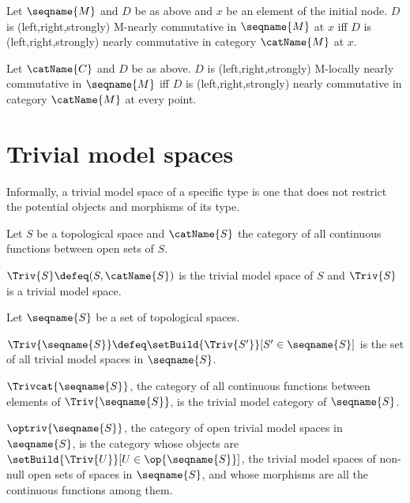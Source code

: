 \documentclass{article}
\begin{document}
\begin{definition}
\label{def:M-NCDp}
Let $\seqname{M}$ and $D$ be as above and $x$ be an element of the
initial node. $D$ is (left,right,strongly) M-nearly commutative in
$\seqname{M}$ at $x$ iff $D$ is (left,right,strongly) nearly commutative
in category $\catName{M}$ at $x$.
\end{definition}

\begin{definition}
\label{def:M-NCDl}
Let $\catName{C}$ and $D$ be as above. $D$ is (left,right,strongly)
M-locally nearly commutative in $\seqname{M}$ iff $D$ is
(left,right,strongly) nearly commutative in category $\catName{M}$ at
every point.
\end{definition}

\section{Trivial model spaces}
\label{sec:triv}
Informally, a trivial model space of a specific type is one that does
not restrict the potential objects and morphisms of its type.

\begin{definition}
\label{def:trivmod}
Let $S$ be a topological space and $\catName{S}$ the category of all
continuous functions between open sets of $S$.

$\Triv{S} \defeq (S, \catName{S})$ is the trivial model space
of $S$ and $\Triv{S}$ is a trivial model space.

Let $\seqname{S}$ be a set of topological spaces.

$
  \Triv{\seqname{S}}
  \defeq
  \setBuild
    {\Triv{S'}}%
    [S' \in \seqname{S}]
$
is the set of all trivial model spaces in $\seqname{S}$.

$\Trivcat{\seqname{S}}$, the category of all continuous functions
between elements of $\Triv{\seqname{S}}$, is the trivial model category
of $\seqname{S}$.

$\optriv{\seqname{S}}$, the category of open trivial model spaces
in $\seqname{S}$, is the category whose objects are
$\setBuild {\Triv{U}}[U \in \op{\seqname{S}}]$, the trivial
model spaces of non-null open sets of spaces in $\seqname{S}$,
and whose morphisms are all the continuous functions among them.
\end{definition}
\end{document}
